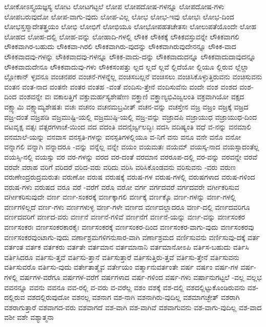 {ಲೋಕೋಽಸ್ತ್ಯಯಜ್ಞಸ್ಯ
ಲೋಟ
ಲೋಟಗಟ್ಟಲೆ
ಲೋಪ
ಲೋಪದೋಷ-ಗಳನ್ನೂ
ಲೋಪದೋಷ-ಗಳು
ಲೋಪಬರುವುದೋ
ಲೋಪ-ವಾಗು-ವುದು
ಲೋಪ-ವಿಲ್ಲ
ಲೋಭ
ಲೋಭ-ಇವು
ಲೋಭಃ
ಲೋಭ-ದಿಂದ
ಲೋಭಸ್ತಸ್ಮಾದೇತತ್ತ್ರಯಂ
ಲೋಭಿ
ಲೋಭಿಗೆ
ಲೋಭಿಯೂ
ಲೋಭೋಪಹತಚೇತಸಃ
ಲೋಲುಪತೆಯೊಂದೇ
ಲೋಹ
ಲೋಹದ
ಲೋಹ-ದಲ್ಲಿ
ಲೋಹ-ವನ್ನು
ಲೋಹಾದಿ-ಗಳಲ್ಲಿ
ಲೌಕಿಕ
ಲೌಕಿಕಕ್ಕೆ
ಲೌಕಿಕವಸ್ತುವನ್ನೇ
ಲೌಕಿಕವಾಗಲಿ
ಲೌಕಿಕವಾಗಿರ-ಬಹುದು
ಲೌಕಿಕವಾ-ಗಿರಲಿ
ಲೌಕಿಕವಾಗಿರು-ವುದನ್ನು
ಲೌಕಿಕವಾಗಿರುವುದೇನನ್ನೂ
ಲೌಕಿಕ-ವಾದ
ಲೌಕಿಕವಾದವು-ಗಳನ್ನು
ಲೌಕಿಕವಾದವು-ಗಳನ್ನೂ
ಲೌಕಿಕ-ವಾದು-ದನ್ನು
ಲೌಕಿಕವಾದುದನ್ನೂ
ಲೌಕಿಕವಾದುದಾವುದನ್ನೂ
ಲೌಕಿಕವಾದುದೇನೂ
ಲೌಕಿಕವಾದುವು-ಗಳು
ಲೌಕಿಕಸಂಪತ್ತು
ಲ್ಲದ
ಲ್ಲದೆ
ಲ್ಲವೆ
ಲ್ಲಿದೆಯೋ
ಲ್ಲಿಯೂ
ಲ್ಲಿರುವ
ಲ್ಲೆಲ್ಲಾ
ಲ್ಲೋಕಾನ್
ಳ್ಳವನೂ
ವಂಚನಪರ
ವಂಚನೆ-ಗಳನ್ನೆಲ್ಲ
ವಂಚಿಸಬಲ್ಲನೆ
ವಂಚಿಸಲು
ವಂಚಿಸಿಕೊಳ್ಳುತ್ತಿರುವನು
ವಂಚಿಸುವನು
ವಂತನ
ವಂತ-ನಾದ
ವಂತನೇ
ವಂತರ
ವಂತಹ
-ವಂತೆ
ವಂದಿಸು-ತ್ತೇನೆ
ವಂದಿಸುವೆನು
ವಂದೇ
ವಂಶ
ವಂಶದ
ವಂಶ-ದಿಂದ
ವಂಶವನ್ನೇ
ವಃ
ವಕಾಲತ್ತಿಗೆ
ವಕ್ತುಮರ್ಹಸ್ಯಶೇಷೇಣ
ವಕ್ತ್ರಾಣಿ
ವಕ್ತ್ರಾಣ್ಯಭಿವಿಜ್ವಲಂತಿ
ವಕ್ರವಾಗಿಯೋ
ವಕ್ಷದ
ವಕ್ಷ್ಯಾಮಿ
ವಕ್ಷ್ಯಾಮ್ಯಶೇಷತಃ
ವಚಃ
ವಚನಂ
ವಚನಮಬ್ರವೀತ್
ವಚನ-ವನ್ನು
ವಚಸ್ತೇನ
ವಜ್ರ
ವಜ್ರಂ
ವಜ್ರಕ್ಕೆ
ವಜ್ರದ
ವಜ್ರ-ದಂತೆ
ವಜ್ರಪಡಿ
ವಜ್ರಮುಷ್ಟಿ-ಯಲ್ಲಿ
ವಜ್ರಮುಷ್ಠಿ-ಯಲ್ಲಿ
ವಜ್ರ-ವನ್ನು
ವಜ್ರಾದಪಿ
ವಜ್ರಾಯುಧ
ವಜ್ರಾಯುಧ-ದಿಂದ
ವಟವೃಕ್ಷ
ವತ್ಸಃ
ವತ್ಸರಗಳಾಚೆ-ಯಿಂದ
ವದ
ವದಂತಿ
ವದನೈರ್ಜ್ವಲದ್ಭಿಃ
ವದಸಿ
ವದಿಷ್ಯಂತಿ
ವಧೆ
ವ-ನನ್ನು
ವನಮಾಲಿ
ವನಮಾಲೆ-ಯನ್ನು
ವನವಾಸ
ವನಸ್ಪತಿ-ಗಳನ್ನು
ವನಸ್ಪತಿಗಳಲ್ಲಿಯೂ
ವ-ನಿಗೆ
ವನು
ವನೂ
ವನೇ
ವನೊ
ವನೋ
ವನ್ನಾಗಲಿ
ವನ್ನಾಗಿ
ವನ್ನಾದರೂ
-ವನ್ನು
ವನ್ನೆಲ್ಲ
ವನ್ನೇ
ವಯಂ
ವಯಮತಃ
ವಯಮ್
ವಯಸ್ಕ-ನಾದ
ವಯಸ್ಸಾದಂತೆಲ್ಲ
ವಯಸ್ಸಿ-ನಲ್ಲಿ
ವಯಸ್ಸು
ವರ
ವರ-ಗಳನ್ನು
ವರದ
ವರ-ದಂತೆ
ವರಮಾನ
ವರರೂಪ-ದಲ್ಲಿ
ವರ-ವನ್ನು
ವರವನ್ನೇ
ವರವೆ
ವರವೇ
ವರಾಹ
ವರಿಗೆ
ವರಿದರೆ
ವರಿದ-ವರು
ವರಿದು
ವರಿಸಿ
ವರಿಸಿಕೊಂಡವನು
ವರಿಸುವನು
-ವರು
ವರುಣ
ವರುಣೇಂದ್ರರುದ್ರಮರುತಃ
ವರುಣೋ
ವರುಷ
ವರುಷಕ್ಕೆ
ವರುಷ-ಗಳ
ವರುಷ-ಗಳಲ್ಲಿ
ವರುಷಗಳಾದ
ವರುಷ-ಗಳಿಂದ
ವರುಷ-ಗಳು
ವರುಷದ
ವರೂ
ವರೆ
-ವರೆಗೆ
ವರೊ
ವರೋ
ವರ್ಗ
ವರ್ಗದವರೆ
ವರ್ಗದವರೇ
ವರ್ಗೀಕರಿಸುವ
ವರ್ಗೀಕರಿಸುವುದೇ
ವರ್ಣ
ವರ್ಣ-ಸಂಕರಕ್ಕೆ
ವರ್ಣಕ್ಕಾಗಲಿ
ವರ್ಣಕ್ಕೆ
ವರ್ಣಕ್ಕೊ
ವರ್ಣ-ಗಳನ್ನು
ವರ್ಣ-ಗಳಲ್ಲಿ
ವರ್ಣಗಳಿಲ್ಲದೆ
ವರ್ಣ-ಗಳು
ವರ್ಣಗಳುಳ್ಳ
ವರ್ಣ-ಗಳೇ
ವರ್ಣದ
ವರ್ಣದಲ್ಲಾದರೂ
ವರ್ಣ-ದಲ್ಲಿ
ವರ್ಣದವರಿಗೂ
ವರ್ಣದವರಿಗೆ
ವರ್ಣದ-ವರು
ವರ್ಣನೆ
ವರ್ಣನೆ-ಗಳಿವೆ
ವರ್ಣನೆಗೆ
ವರ್ಣನೆ-ಯನ್ನು
ವರ್ಣ-ವನ್ನು
ವರ್ಣಸಂಕರ
ವರ್ಣಸಂಕರಃ
ವರ್ಣಸಂಕರಕಾರಕೈಃ
ವರ್ಣಸಂಕರಕ್ಕೆ
ವರ್ಣಸಂಕರ-ದಿಂದ
ವರ್ಣಸಂಕರ-ವಾಗು-ವುದು
ವರ್ಣಸಂಕರವು
ವರ್ಣಸಂಕರವುಂಟಾಗು-ವುದು
ವರ್ಣಾಶ್ರಮಗಳಿಗನುಸಾರ-ವಾಗಿ
ವರ್ಣಾಶ್ರಮದ
ವರ್ಣಿಸುವನು
ವರ್ಣಿಸುವು-ದಕ್ಕೆ
ವರ್ತ
ವರ್ತಂತ
ವರ್ತಕ
ವರ್ತಕರು
ವರ್ತತೇ
ವರ್ತಮಾನ
ವರ್ತಮಾನಾನಿ
ವರ್ತಮಾನೋಽಪಿ
ವರ್ತಿಸ-ಬಹುದು
ವರ್ತಿಸಿ
ವರ್ತಿಸಿದರೂ
ವರ್ತಿಸು-ತ್ತವೆ
ವರ್ತಿಸು-ತ್ತಾನೆ
ವರ್ತಿಸುತ್ತಾರೆ
ವರ್ತಿಸುತ್ತಿರು-ತ್ತವೆ
ವರ್ತಿಸು-ತ್ತೇನೆ
ವರ್ತಿಸುವನು
ವರ್ತಿಸುವರೊ
ವರ್ತಿಸು-ವುದು
ವರ್ತೇತಾತ್ಮೈವ
ವರ್ತೇಯಂ
ವರ್ತ್ಮಾನುವರ್ತಂತೇ
ವರ್ಷ
ವರ್ಷಂ
ವರ್ಷ-ಗಳ
ವರ್ಷ-ಗಳಲ್ಲಿ
ವರ್ಷಗಳ-ವರೆಗೂ
ವರ್ಷಗಳ-ವರೆಗೆ
ವರ್ಷಗಳಾದ
ವರ್ಷ-ಗಳಿಂದ
ವರ್ಷ-ಗಳು
ವರ್ಷಾನುಗಟ್ಟಲೆ
-ವಲ್ಲ
ವಲ್ಲಭ
ವವನನ್ನೂ
ವವನು
ವವನೂ
ವವ-ರಲ್ಲಿ
ವ-ವರು
ವ-ವರೆಲ್ಲ
ವಶಂ
ವಶಕ್ಕೆ
ವಶ-ದಲ್ಲಿ
ವಶದಲ್ಲಿಟ್ಟುಕೊಂಡಿರುವನು
ವಶ-ದಲ್ಲಿರುವ
ವಶದಲ್ಲಿರುವುದೋ
ವಶನಲ್ಲ
ವಶನಾಗ
ವಶ-ನಾಗಿ
ವಶನಾಗಿರು-ವುದಿಲ್ಲ
ವಶಮಾಗಚ್ಛೇತ್
ವಶರಾಗಿ
ವಶರಾಗುತ್ತಾರೆ
ವಶವಾಗದ-ವರು
ವಶವಾಗದೆ
ವಶ-ವಾಗಿ
ವಶ-ವಾಗಿವೆ
ವಶವಾಗುವನು
ವಶ-ವಾಗು-ವುದಿಲ್ಲ
ವಶ-ವಾದ
ವಶೀ
ವಶೇ
ವಶ್ಯಾತ್ಮನಾ
}
